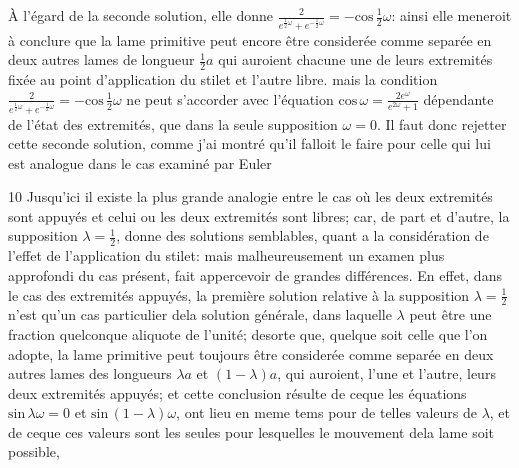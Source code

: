 \documentclass[11pt,a4paper]{article}
\begin{document}
À l'égard de la seconde solution, elle donne $\frac{2}{e^{\frac{1}{2}\omega} + e^{-\frac{1}{2}\omega}} = -\text{cos}\,\tfrac{1}{2}\omega$: ainsi
elle meneroit à conclure que la lame primitive peut encore être considerée
comme separée en deux autres lames de longueur $\frac{1}{2}a$ qui auroient chacune
une de leurs extremités fixée au point d'application du stilet et l'autre libre.
mais la condition $\frac{2}{e^{\frac{1}{2}\omega} + e^{-\frac{1}{2}\omega}} = -\text{cos}\,\tfrac{1}{2}\omega$ ne peut s'accorder avec l'équation
$\text{cos}\,\omega = \frac{2e^{\omega}}{e^{2\omega} + 1}$ dépendante de l'état des extremités, que dans la seule
supposition $\omega = 0$. Il faut donc rejetter cette seconde solution, comme j'ai montré
qu'il falloit le faire pour celle qui lui est analogue dans le cas examiné par
Euler

10 Jusqu'ici il existe la plus grande analogie entre le cas où les deux
extremités sont appuyés et celui ou les deux extremités sont libres; car, de
part et d'autre, la supposition $\lambda = \frac{1}{2}$, donne des solutions semblables,
quant a la considération de l'effet de l'application du stilet: mais
malheureusement un examen plus approfondi du cas présent, fait appercevoir
de grandes différences. En effet, dans le cas des extremités appuyés, la
première solution relative à la supposition $\lambda = \frac{1}{2}$ n'est qu'un cas particulier
dela solution générale, dans laquelle $\lambda$ peut être une fraction quelconque
aliquote de l'unité; desorte que, quelque soit celle que l'on adopte, la lame
primitive peut toujours être considerée comme separée en deux autres lames
des longueurs $\lambda a$ et $(1-\lambda)a$, qui auroient, l'une et l'autre, leurs deux extremités
appuyés; et cette conclusion résulte de ceque les équations $\text{sin}\,\lambda\omega = 0$ et
$\text{sin}\,(1-\lambda)\omega$, ont lieu en meme tems pour de telles valeurs de $\lambda$, et de ceque
ces valeurs sont les seules pour lesquelles le mouvement dela lame soit
possible,
\end{document}
